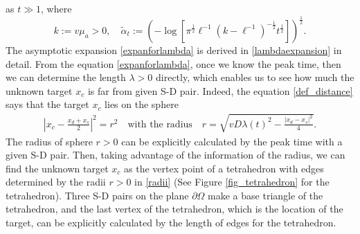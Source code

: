 \documentclass[10pt]{article}
\numberwithin{equation}{section}
\numberwithin{figure}{section}
\begin{document}
as $t \gg 1$, where
\begin{equation}\label{def_alphatilde}
k := v \mu_a >0, \quad \tilde \alpha_t:=
 \left(-\log\left[ \pi^{\frac{1}{2}} \ell^{-1} (k-\ell^{-1})^{-\frac{1}{2}} t^\frac{1}{2} \right] \right)^\frac{1}{2}.
\end{equation}
The asymptotic expansion \eqref{expanforlambda} is derived in 
\eqref{lambdaexpansion} in detail.
From the equation \eqref{expanforlambda}, once we know the peak time, then we can determine the length $\lambda>0$ directly, which enables us to see how much the unknown target $x_c$ is far from given S-D pair.
Indeed, the equation \eqref{def_distance} says that the target $x_c$ lies on the sphere 
\begin{equation}\label{radii}
\begin{split}
\left|x_c - \frac{x_d + x_s}{2}\right|^2 
= r^2 \quad
\mbox{with the radius} \quad 
r = \sqrt{vD\lambda(t)^2
- \frac{|x_d - x_s|^2}{4}}. 
\end{split}
\end{equation}
The radius of sphere $r>0$ can be explicitly calculated by the peak time with a given S-D pair. 
Then, 
taking advantage of the information of the radius, 
we can find the unknown target $x_c$ as the vertex point of a tetrahedron with edges determined by the radii $r>0$ in \eqref{radii} (See Figure \ref{fig_tetrahedron} for the tetrahedron). Three S-D pairs on the plane $\partial \Omega$ make a base triangle of the tetrahedron, and the last vertex of the tetrahedron, which is the location of the target, can be explicitly calculated by the length of edges for the tetrahedron. 
\end{document}
